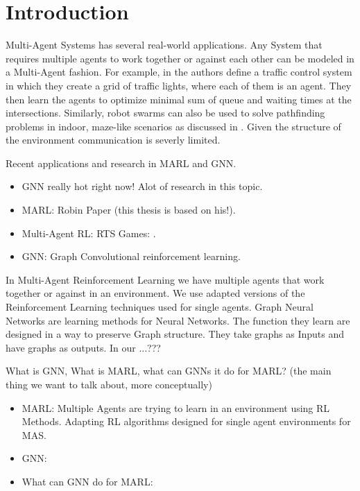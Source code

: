 
\chapter{Introduction}
Multi-Agent Systems has several real-world applications. Any System that requires multiple agents to work together or against each other can be modeled in a Multi-Agent fashion. For example, in \citet{MARLTraffic2020} the authors define a traffic control system in which they create a grid of traffic lights, where each of them is an agent. They then learn the agents to optimize minimal sum of queue and waiting times at the intersections. Similarly, robot swarms can also be used to solve pathfinding problems in indoor, maze-like scenarios as discussed in \citet{SwarmPathFinding2013}. Given the structure of the environment communication is severly limited. 
\par

Recent applications and research in MARL and GNN.
\begin{itemize}[noitemsep,nolistsep]
	\item GNN really hot right now! Alot of research in this topic.
	\item MARL: Robin Paper (this thesis is based on his!). 
	\item Multi-Agent RL: RTS Games: \citet{RTSMARL2021}.
	\item GNN: Graph Convolutional reinforcement learning.
\end{itemize} \par

In Multi-Agent Reinforcement Learning we have multiple agents that work together or against in an environment. We use adapted versions of the Reinforcement Learning techniques used for single agents. Graph Neural Networks are learning methods for Neural Networks. The function they learn are designed in a way to preserve Graph structure. They take graphs as Inputs and have graphs as outputs. In our ...???

What is GNN, What is MARL, what can GNNs it do for MARL? (the main thing we want to talk about, more conceptually)
\begin{itemize}[noitemsep,nolistsep]
	\item MARL: Multiple Agents are trying to learn in an environment using RL Methods. Adapting RL algorithms designed for single agent environments for MAS.
	\item GNN: 
	\item What can GNN do for MARL:
\end{itemize} \par

